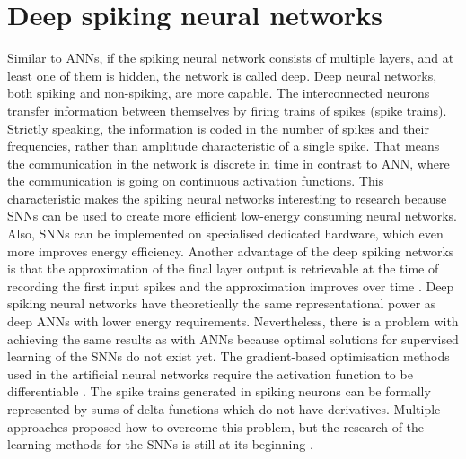 \section{Deep spiking neural networks}
Similar to ANNs, if the spiking neural network consists of multiple layers, and at least one of them is hidden, the network is called deep. Deep neural networks, both spiking and non-spiking, are more capable. The interconnected neurons transfer information between themselves by firing trains of spikes (spike trains). Strictly speaking, the information is coded in the number of spikes and their frequencies, rather than amplitude characteristic of a single spike. That means the communication in the network is discrete in time in contrast to ANN, where the communication is going on continuous activation functions. This characteristic makes the spiking neural networks interesting to research because SNNs can be used to create more efficient low-energy consuming neural networks. Also, SNNs can be implemented on specialised dedicated hardware, which even more improves energy efficiency. Another advantage of the deep spiking networks is that the approximation of the final layer output is retrievable at the time of recording the first input spikes and the approximation improves over time \cite{pfeifferDeepLearningSpiking2018}.
Deep spiking neural networks have theoretically the same representational power as deep ANNs with lower energy requirements. Nevertheless, there is a problem with achieving the same results as with ANNs because optimal solutions for supervised learning of the SNNs do not exist yet. The gradient-based optimisation methods used in the artificial neural networks require the activation function to be differentiable \cite{tavanaeiDeepLearningSpiking2019}. The spike trains generated in spiking neurons can be formally represented by sums of delta functions which do not have derivatives. Multiple approaches proposed how to overcome this problem, but the research of the learning methods for the SNNs is still at its beginning \cite{tavanaeiDeepLearningSpiking2019}. 

